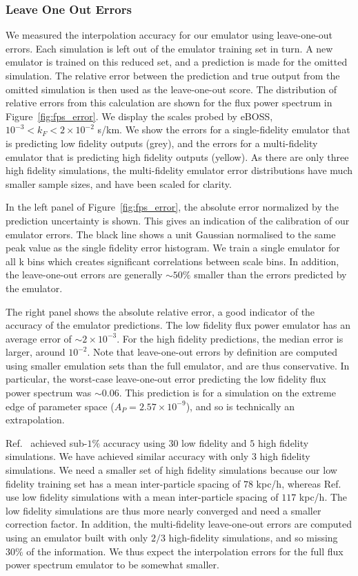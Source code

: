 \documentclass[a4paper,11pt]{article}
\begin{document}
\subsubsection{Leave One Out Errors}

We measured the interpolation accuracy for our emulator using leave-one-out errors. Each simulation is left out of the emulator training set in turn. A new emulator is trained on this reduced set, and a prediction is made for the omitted simulation. The relative error between the prediction and true output from the omitted simulation is then used as the leave-one-out score.
The distribution of relative errors from this calculation are shown for the flux power spectrum in Figure~\ref{fig:fps_error}. We display the scales probed by eBOSS, $10^{-3} < k_F < 2 \times 10^{-2}$ s/km.
We show the errors for a single-fidelity emulator that is predicting low fidelity outputs (grey), and the errors for a multi-fidelity emulator that is predicting high fidelity outputs (yellow). As there are only three high fidelity simulations, the multi-fidelity emulator error distributions have much smaller sample sizes, and have been scaled for clarity.

In the left panel of Figure~\ref{fig:fps_error}, the absolute error normalized by the prediction uncertainty is shown. This gives an indication of the calibration of our emulator errors. The black line shows a unit Gaussian normalised to the same peak value as the single fidelity error histogram. We train a single emulator for all k bins which creates significant correlations between scale bins. In addition, the leave-one-out errors are generally $\sim 50\%$ smaller than the errors predicted by the emulator.

The right panel shows the absolute relative error, a good indicator of the accuracy of the emulator predictions.
The low fidelity flux power emulator has an average error of $\sim 2\times 10^{-3}$. For the high fidelity predictions, the median error is larger, around $10^{-2}$. Note that leave-one-out errors by definition are computed using smaller emulation sets than the full emulator, and are thus conservative. In particular, the worst-case leave-one-out error predicting the low fidelity flux power spectrum was $\sim 0.06$. This prediction is for a simulation on the extreme edge of parameter space ($A_P = 2.57\times10^{-9}$), and so is technically an extrapolation.

Ref.~\cite{Fernandez:2022} achieved sub-$1\%$ accuracy using $30$ low fidelity and $5$ high fidelity simulations. We have achieved similar accuracy with only $3$ high fidelity simulations. We need a smaller set of high fidelity simulations because our low fidelity training set has a mean inter-particle spacing of $78$ kpc/h, whereas Ref.~\cite{Fernandez:2022} use low fidelity simulations with a mean inter-particle spacing of $117$ kpc/h. The low fidelity simulations are thus more nearly converged and need a smaller correction factor. In addition, the multi-fidelity leave-one-out errors are computed using an emulator built with only $2/3$ high-fidelity simulations, and so missing $30\%$ of the information. We thus expect the interpolation errors for the full flux power spectrum emulator to be somewhat smaller.
\end{document}
